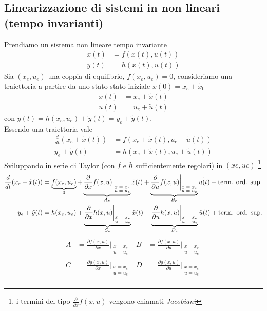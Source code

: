 \documentclass{article}
\numberwithin{equation}{subsection}
\let\oldsubsection\subsection%
\renewcommand{\subsection}{%
  \renewcommand{\theequation}{\thesubsection.\arabic{equation}}%
  \oldsubsection}%
\begin{document}
\subsection{Linearizzazione di sistemi in non lineari (tempo invarianti)}
Prendiamo un  sistema non lineare tempo invariante
\begin{align*}
    \dot x(t) &= f (x(t), u(t))\\
    y(t) &= h(x(t), u(t))
\end{align*}
Sia $(x_e,u_e)$ una coppia di equilibrio, $f(x_e,u_e)=0$, consideriamo una traiettoria a partire da uno stato stato iniziale $x(0)=x_e+ \tilde{x}_0$ 
\begin{align*}
    x(t) &= x_e + \tilde{x}(t)\\
    u(t) &= u_e + \tilde{u}(t)
\end{align*}
con $y(t) = h(x_e , u_e ) + \tilde{y}(t) = y_e + \tilde{y}(t)$.\\
Essendo una traiettoria vale
\begin{align*}
    \frac{d}{dt}(x_e + \tilde{x}(t)) &= f (x_e + \tilde{x}(t), u_e + \tilde{u}(t))\\
    y_e + \tilde{y}(t) &= h(x_e+\tilde{x}(t), u_e+ \tilde{u}(t))
\end{align*}
Sviluppando in serie di Taylor (con $f$ e $h$ sufficientemente regolari) in $(xe , ue )$ \footnote[1]{i termini del tipo $\frac{\partial}{\partial x}f(x,u)$ vengono chiamati \textit{Jacobiani}}
\begin{align*}
    \frac{d}{dt}(x_e + \tilde{x}(t)) &= \underbrace{f(x_e,u_e)}_{0} + \underbrace{\frac{\partial}{\partial x}f(x,u)\bigg|_{\substack{\text{$x=x_e$} \\ \text{$u=u_e$}}}}_{A_e} \tilde{x}(t) + \underbrace{\frac{\partial}{\partial u}f(x,u)\bigg|_{\substack{\text{$x=x_e$} \\ \text{$u=u_e$}}}}_{B_e} \tilde{u(t)} + \text{term. ord. sup.}\\
    y_e+\tilde{y}(t) &= h(x_e,u_e) + \underbrace{\frac{\partial}{\partial x}h(x,u) \bigg|_{\substack{\text{$x=x_e$} \\ \text{$u=u_e$}}}}_{C_e} \tilde{x}(t) + \underbrace{\frac{\partial}{\partial u}h(x,u) \bigg|_{\substack{\text{$x=x_e$} \\ \text{$u=u_e$}}}}_{D_e} \tilde{u}(t) + \text{term. ord. sup.}
\end{align*} 
\begin{align*}
    A &= \frac{\partial f(x,u)}{\partial x} \Biggl |_{\substack{\text{$x=x_e$} \\ \text{$u=u_e$}}} &
    B &= \frac{\partial f(x,u)}{\partial u} \Biggl |_{\substack{\text{$x=x_e$} \\ \text{$u=u_e$}}}\\
    C &= \frac{\partial g(x,u)}{\partial x} \Biggl |_{\substack{\text{$x=x_e$} \\ \text{$u=u_e$}}} &
    D &= \frac{\partial g(x,u)}{\partial u} \Biggl |_{\substack{\text{$x=x_e$} \\ \text{$u=u_e$}}}\\
\end{align*}
\end{document}
